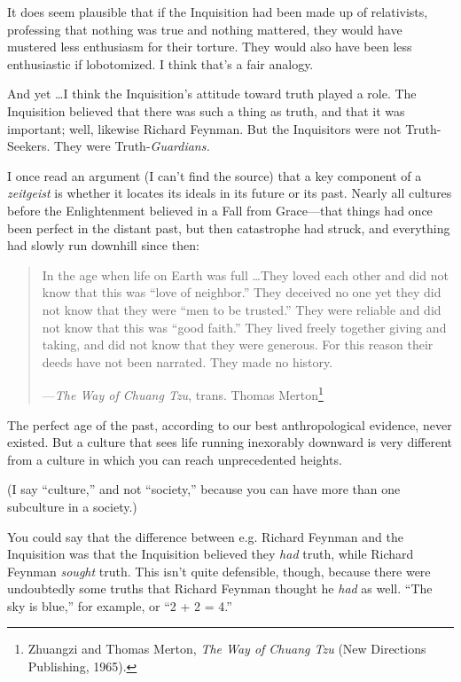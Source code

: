 {
 It does seem plausible that if the Inquisition had been made up of
relativists, professing that nothing was true and nothing mattered,
they would have mustered less enthusiasm for their torture. They would
also have been less enthusiastic if lobotomized. I think
that's a fair analogy.}

{
 And yet \ldots I think the Inquisition's attitude
toward truth played a role. The Inquisition believed that there was
such a thing as truth, and that it was important; well, likewise
Richard Feynman. But the Inquisitors were not Truth-Seekers. They were
Truth-\textit{Guardians.}}

{
 I once read an argument (I can't find the source)
that a key component of a \textit{zeitgeist} is whether it locates its
ideals in its future or its past. Nearly all cultures before the
Enlightenment believed in a Fall from Grace---that things had once been
perfect in the distant past, but then catastrophe had struck, and
everything had slowly run downhill since then:}

\begin{quote}
{
 In the age when life on Earth was full \ldots They loved each other
and did not know that this was ``love of
neighbor.'' They deceived no one yet they did not
know that they were ``men to be
trusted.'' They were reliable and did not know that
this was ``good faith.'' They lived
freely together giving and taking, and did not know that they were
generous. For this reason their deeds have not been narrated. They made
no history.}

{\raggedleft
 {}---\textit{The Way of Chuang Tzu}, trans. Thomas
Merton\footnote{Zhuangzi and Thomas Merton, \textit{The Way of Chuang Tzu} (New
Directions Publishing, 1965).}
\par}
\end{quote}

{
 The perfect age of the past, according to our best anthropological
evidence, never existed. But a culture that sees life running
inexorably downward is very different from a culture in which you can
reach unprecedented heights.}

{
 (I say ``culture,'' and not
``society,'' because you can have
more than one subculture in a society.)}

{
 You could say that the difference between e.g. Richard Feynman and
the Inquisition was that the Inquisition believed they \textit{had}
truth, while Richard Feynman \textit{sought} truth. This
isn't quite defensible, though, because there were
undoubtedly some truths that Richard Feynman thought he \textit{had} as
well. ``The sky is blue,'' for
example, or ``2 + 2 = 4.''}

